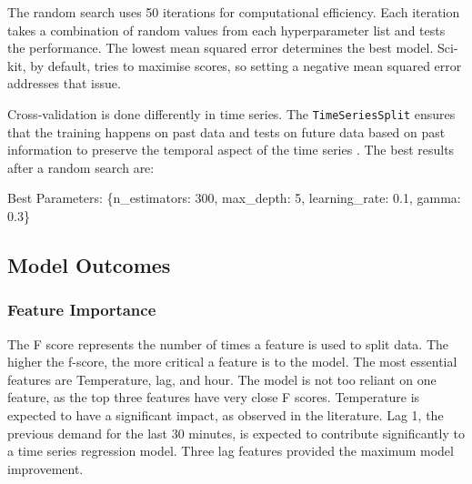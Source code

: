 \documentclass[mstat,12pt]{unswthesis}
\newenvironment{Shaded}{\begin{snugshade}}{\end{snugshade}}
\newcommand{\DecValTok}[1]{\textcolor[rgb]{0.00,0.00,0.81}{#1}}
\newcommand{\FloatTok}[1]{\textcolor[rgb]{0.00,0.00,0.81}{#1}}
\newcommand{\NormalTok}[1]{#1}
\newcommand{\StringTok}[1]{\textcolor[rgb]{0.31,0.60,0.02}{#1}}
\begin{document}
The random search uses 50 iterations for computational efficiency. Each
iteration takes a combination of random values from each hyperparameter
list and tests the performance. The lowest mean squared error determines
the best model. Sci-kit, by default, tries to maximise scores, so
setting a negative mean squared error addresses that issue.

Cross-validation is done differently in time series. The
\texttt{TimeSeriesSplit} ensures that the training happens on past data
and tests on future data based on past information to preserve the
temporal aspect of the time series \cite{scikit-learn2024}. The best
results after a random search are:

\begin{Shaded}
\begin{Highlighting}[]
\NormalTok{Best Parameters: \{}\StringTok{\textquotesingle{}n\_estimators\textquotesingle{}}\NormalTok{: }\DecValTok{300}\NormalTok{, }
                  \StringTok{\textquotesingle{}max\_depth\textquotesingle{}}\NormalTok{: }\DecValTok{5}\NormalTok{, }
                  \StringTok{\textquotesingle{}learning\_rate\textquotesingle{}}\NormalTok{: }\FloatTok{0.1}\NormalTok{, }
                  \StringTok{\textquotesingle{}gamma\textquotesingle{}}\NormalTok{: }\FloatTok{0.3}\NormalTok{\}}
\end{Highlighting}
\end{Shaded}

\hypertarget{model-outcomes}{%
\subsection{Model Outcomes}\label{model-outcomes}}

\hypertarget{feature-importance}{%
\subsubsection{Feature Importance}\label{feature-importance}}

The F score represents the number of times a feature is used to split
data. The higher the f-score, the more critical a feature is to the
model. The most essential features are Temperature, lag, and hour. The
model is not too reliant on one feature, as the top three features have
very close F scores. Temperature is expected to have a significant
impact, as observed in the literature. Lag 1, the previous demand for
the last 30 minutes, is expected to contribute significantly to a time
series regression model. Three lag features provided the maximum model
improvement.
\end{document}
